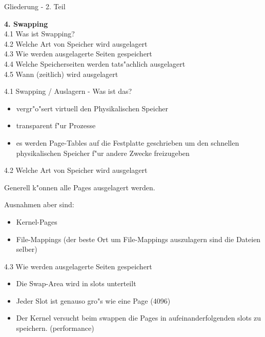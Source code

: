 \documentclass[landscape]{slides}
\begin{document}
%
%
%
%
%
%
%
\begin{slide}{Gliederung - 2. Teil}

\textbf{4. Swapping}\\
4.1 Was ist Swapping?\\
4.2 Welche Art von Speicher wird ausgelagert\\
4.3 Wie werden ausgelagerte Seiten gespeichert\\
4.4 Welche Speicherseiten werden tats"achlich ausgelagert\\
4.5 Wann (zeitlich) wird ausgelagert
\end{slide}

%
\begin{slide}{4.1 Swapping / Auslagern - Was ist das?}
\begin{itemize}
\item vergr"o"sert virtuell den Physikalischen Speicher
\item transparent f"ur Prozesse
\item es werden Page-Tables auf die Festplatte geschrieben um den schnellen physikalischen Speicher f"ur andere Zwecke freizugeben
\end{itemize}
\end{slide}
%
%
%
\begin{slide}{4.2 Welche Art von Speicher wird ausgelagert}

Generell k"onnen alle Pages ausgelagert werden.

Ausnahmen aber sind:
\begin{itemize}
\item Kernel-Pages
\item File-Mappings (der beste Ort um File-Mappings auszulagern sind die Dateien selber)
\end{itemize}
\end{slide}
%
%
\begin{slide}{4.3 Wie werden ausgelagerte Seiten gespeichert}

\begin{itemize}
\item Die Swap-Area wird in slots unterteilt
\item Jeder Slot ist genauso gro"s wie eine Page (4096)                         \item Der Kernel versucht beim swappen die Pages in aufeinanderfolgenden slots zu speichern. (performance) 
\end{itemize}
\end{slide}
\end{document}
